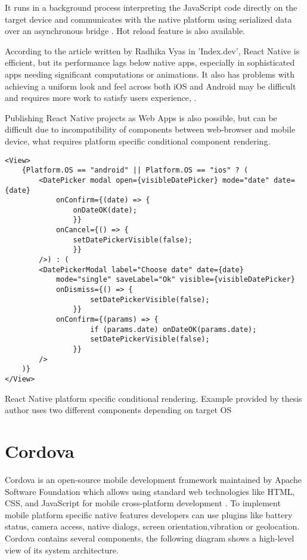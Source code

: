 It runs in a background process interpreting the JavaScript code directly on the target device and communicates with the native platform using serialized data over an asynchronous bridge \autocite{ReactNativeMedium}. Hot reload feature is also available.

According to the article written by Radhika Vyas  in 'Index.dev', React Native is efficient, but its performance lags below native apps, especially in sophisticated apps needing significant computations or animations. It also has problems with achieving a uniform look and feel across both iOS and Android may be difficult and requires more work to satisfy users experience, \textcite{Vyas}.

Publishing React Native projects as Web Apps is also possible, but can be difficult due to incompatibility of components between web-browser and mobile device, what requires platform specific conditional component rendering.



\begin{listing}[H]
\begin{verbatim}
<View>
    {Platform.OS == "android" || Platform.OS == "ios" ? (
        <DatePicker modal open={visibleDatePicker} mode="date" date={date}
            onConfirm={(date) => {
                onDateOK(date);
                }}
            onCancel={() => {
                setDatePickerVisible(false);
                }}
        />) : (
        <DatePickerModal label="Choose date" date={date}
            mode="single" saveLabel="Ok" visible={visibleDatePicker}
            onDismiss={() => {
                    setDatePickerVisible(false);
                }}
            onConfirm={(params) => {
                    if (params.date) onDateOK(params.date);
                    setDatePickerVisible(false);
                }}
        />
    )}
</View>
\end{verbatim}
\caption[React Native platform specific conditional rendering]{React Native platform specific conditional rendering. Example provided by thesis author uses two different components depending on target OS}
\end{listing}
                

\section{{Cordova}}
\label{sec:cordova}
Cordova is an open-source mobile development framework maintained by Apache Software Foundation which allows using standard web technologies like HTML, CSS, and JavaScript for mobile cross-platform development \autocite{CordovaDoc}. To implement mobile platform specific native features developers can use plugins like battery status, camera access, native dialogs, screen orientation,vibration or geolocation. Cordova contains several components, the following diagram shows a high-level view of its system architecture.

